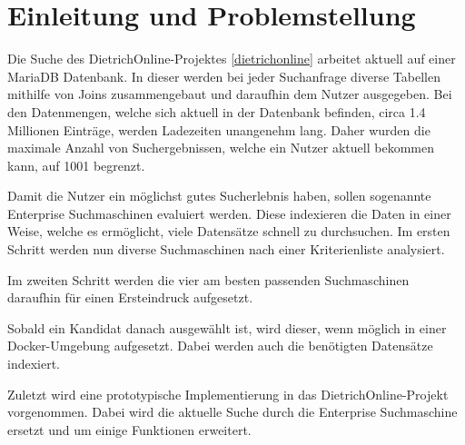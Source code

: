 \chapter{Einleitung und Problemstellung}


Die Suche des DietrichOnline-Projektes \ref{dietrichonline} arbeitet aktuell auf einer MariaDB Datenbank. In dieser werden bei jeder Suchanfrage diverse Tabellen mithilfe von Joins zusammengebaut und daraufhin dem Nutzer ausgegeben. Bei den Datenmengen, welche sich aktuell in der Datenbank befinden, circa 1.4 Millionen Einträge, werden Ladezeiten unangenehm lang. Daher wurden die maximale Anzahl von Suchergebnissen, welche ein Nutzer aktuell bekommen kann, auf 1001 begrenzt. 

Damit die Nutzer ein möglichst gutes Sucherlebnis haben, sollen sogenannte Enterprise Suchmaschinen evaluiert werden. Diese indexieren die Daten in einer Weise, welche es ermöglicht, viele Datensätze schnell zu durchsuchen. Im ersten Schritt werden nun diverse Suchmaschinen nach einer Kriterienliste analysiert.

Im zweiten Schritt werden die vier am besten passenden Suchmaschinen daraufhin für einen Ersteindruck aufgesetzt.

Sobald ein Kandidat danach ausgewählt ist, wird dieser, wenn möglich in einer Docker-Umgebung aufgesetzt. Dabei werden auch die benötigten Datensätze indexiert.

Zuletzt wird eine prototypische Implementierung in das DietrichOnline-Projekt vorgenommen. Dabei wird die aktuelle Suche durch die Enterprise Suchmaschine ersetzt und um einige Funktionen erweitert. 
